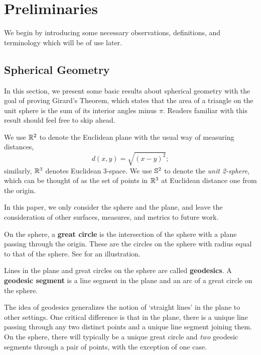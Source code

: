\section{Preliminaries}\label{sec:prelims}

We begin by introducing some necessary observations, definitions, and terminology
which will be of use later.  
\subsection{Spherical Geometry}

In this section, we present some basic results about spherical geometry with the goal of proving Girard's Theorem, which states that the area of a triangle on the unit sphere is the sum of its interior angles minus $\pi$.  Readers familiar with this result should feel free to skip ahead.



We use $\mathbb{R}^2$ to denote the 
Euclidean plane with the usual way of measuring distances, 
$$d(x,y) = \sqrt{(x-y)^2};$$
similarly, $\mathbb{R}^3$ denotes Euclidean 3-space.  We use $\mathbb{S}^2$ to denote the \textit{unit 2-sphere}, which can be 
thought of as the set of points in $\mathbb{R}^3$ at Euclidean distance one from the origin.  
 
In this paper, we only consider the sphere and the plane, and leave the consideration of other surfaces, measures, and metrics to future work.







\begin{definition}
{On the sphere, a \textbf{great circle} is the intersection of the sphere with a plane passing through the origin.} These are the circles on the sphere with radius equal to that of the sphere.  See  for an illustration.
\end{definition}

\begin{definition}

Lines in the plane and great circles on the sphere are called \textbf{geodesics}.  A \textbf{geodesic segment} is a line segment in the plane and an arc of a great circle on the sphere.
	
\end{definition}  



{The idea of {geodesics} generalizes the notion of \enquote*{straight lines} in the plane to other settings.} One critical difference is that in the plane, there is a unique line passing through any two distinct points and a unique line segment joining them.  On the sphere, there will typically be a unique great circle and \textit{two} geodesic segments through a pair of points, with the exception of one case.


